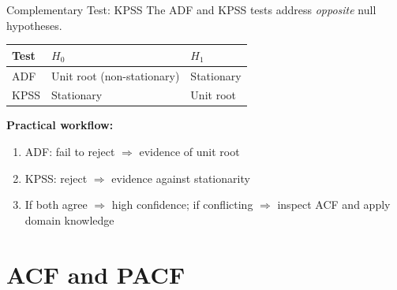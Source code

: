 \documentclass[aspectratio=169, 11pt]{beamer}
\begin{document}
\begin{frame}{Complementary Test: KPSS}
  The ADF and KPSS tests address \emph{opposite} null hypotheses.
  \begin{center}
    {\small
    \begin{tabular}{lll}
      \toprule
      \textbf{Test} & \textbf{$H_0$} & \textbf{$H_1$} \\
      \midrule
      ADF \parencite{DickeyFuller1979}    & Unit root (non-stationary) & Stationary \\
      KPSS \parencite{Kwiatkowski1992}    & Stationary                 & Unit root \\
      \bottomrule
    \end{tabular}
    }
  \end{center}
  \vspace{0.1cm}
  \textbf{Practical workflow:}
  \begin{enumerate}\small
    \item ADF: fail to reject $\Rightarrow$ evidence of unit root
    \item KPSS: reject $\Rightarrow$ evidence against stationarity
    \item If both agree $\Rightarrow$ high confidence; if conflicting $\Rightarrow$
          inspect ACF and apply domain knowledge
  \end{enumerate}
\end{frame}

\section{ACF and PACF}

\end{document}
